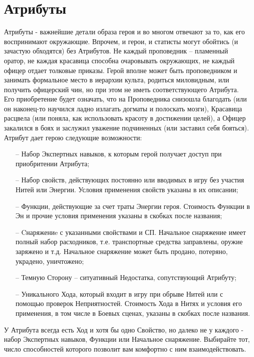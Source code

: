 \section{Атрибуты}
Атрибуты - важнейшие детали образа героя и во многом отвечают за то, как его воспринимают окружающие. 
\newline Впрочем, и герои, и статисты могут обойтись (и зачастую обходятся) без Атрибутов. Не каждый проповедник – пламенный оратор, не каждая красавица способна очаровывать окружающих, не каждый офицер отдает толковые приказы. Герой вполне может быть проповедником и занимать формальное место в иерархии культа, родиться миловидным, или получить офицерский чин, но при этом не иметь соответствующего Атрибута. Его приобретение будет означать, что на Проповедника снизошла благодать (или он наконец-то научился ладно излагать догматы и полоскать мозги), Красавица расцвела (или поняла, как использовать красоту в достижении целей), а Офицер закалился в боях и заслужил уважение подчиненных (или заставил себя бояться).
Атрибут дает герою следующие возможности:
\begin{itemize}
    \item[--] Набор Экспертных навыков, к которым герой получает доступ при приобритении Атрибута;
    \item[--] Набор свойств, действующих постоянно или вводимых в игру без участия Нитей или Энергии. Условия применения свойств указаны в их описании;
    \item[--] Функции, действующие за счет траты Энергии героя. Стоимость Функции в Эн и прочие условия применения указаны в скобках после названия;
    \item[--] Cнаряжениe с указанными свойствами и СП. Начальное снаряжение имеет полный набор расходников, т.е. транспортные средства заправлены, оружие заряжено и т.д. Начальное снаряжение может быть продано, потеряно, украдено, уничтожено;
    \item[--] Темную Сторону – ситуативный Недостатка, сопутствующий Атрибуту;
    \item[--] Уникального Хода, который входит в игру при обрыве Нитей или с помощью проверок Неприятностей. Стоимость Хода в Нитях и условия его применения, в том числе в Боевых сценах, указаны в скобках после названия.
\end{itemize}

\begin{tcolorbox}
    У Атрибута всегда есть Ход и хотя бы одно Свойство, но далеко не у каждого - набор Экспертных навыков, Функции или Начальное снаряжение. Выбирайте тот, число способностей которого позволит вам комфортно с ним взаимодействовать.
\end{tcolorbox}

